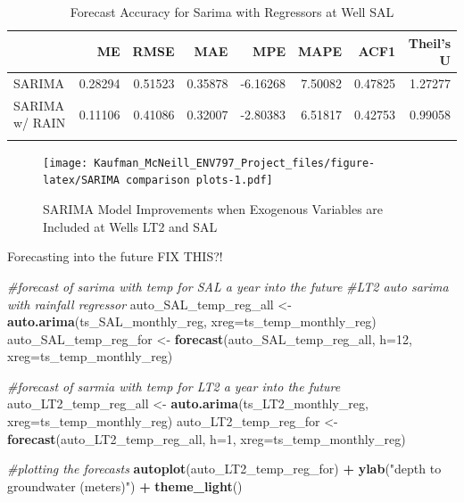\documentclass[
]{article}
\newenvironment{Shaded}{\begin{snugshade}}{\end{snugshade}}
\newcommand{\AttributeTok}[1]{\textcolor[rgb]{0.13,0.29,0.53}{#1}}
\newcommand{\CommentTok}[1]{\textcolor[rgb]{0.56,0.35,0.01}{\textit{#1}}}
\newcommand{\DecValTok}[1]{\textcolor[rgb]{0.00,0.00,0.81}{#1}}
\newcommand{\FunctionTok}[1]{\textcolor[rgb]{0.13,0.29,0.53}{\textbf{#1}}}
\newcommand{\NormalTok}[1]{#1}
\newcommand{\OtherTok}[1]{\textcolor[rgb]{0.56,0.35,0.01}{#1}}
\newcommand{\SpecialCharTok}[1]{\textcolor[rgb]{0.81,0.36,0.00}{\textbf{#1}}}
\newcommand{\StringTok}[1]{\textcolor[rgb]{0.31,0.60,0.02}{#1}}
\begin{document}
\begin{table}
\centering\centering
\caption{\label{tab:compare accuracy for all SARIMAs}Forecast Accuracy for Sarima with Regressors at Well SAL}
\centering
\begin{tabular}[t]{l|r|r|r|r|r|r|r}
\hline
  & ME & RMSE & MAE & MPE & MAPE & ACF1 & Theil's U\\
\hline
SARIMA & 0.28294 & 0.51523 & 0.35878 & -6.16268 & 7.50082 & 0.47825 & 1.27277\\
\hline
SARIMA w/ RAIN & 0.11106 & 0.41086 & 0.32007 & -2.80383 & 6.51817 & 0.42753 & 0.99058\\
\hline
\cellcolor{gray!10}{SARIMA w/ TEMP} & \cellcolor{gray!10}{-0.03167} & \cellcolor{gray!10}{0.35584} & \cellcolor{gray!10}{0.28774} & \cellcolor{gray!10}{0.03923} & \cellcolor{gray!10}{5.75457} & \cellcolor{gray!10}{0.32779} & \cellcolor{gray!10}{0.84574}\\
\hline
\end{tabular}
\end{table}

\begin{figure}
\centering
\texttt{[image: Kaufman\_McNeill\_ENV797\_Project\_files/figure-latex/SARIMA comparison plots-1.pdf]}
\caption{SARIMA Model Improvements when Exogenous Variables are Included
at Wells LT2 and SAL}
\end{figure}

Forecasting into the future FIX THIS?!

\begin{Shaded}
\begin{Highlighting}[]
\CommentTok{\#forecast of sarima with temp for SAL a year into the future}
\CommentTok{\#LT2 auto sarima with rainfall regressor}
\NormalTok{auto\_SAL\_temp\_reg\_all }\OtherTok{\textless{}{-}} \FunctionTok{auto.arima}\NormalTok{(ts\_SAL\_monthly\_reg, }
                                    \AttributeTok{xreg=}\NormalTok{ts\_temp\_monthly\_reg)}
\NormalTok{auto\_SAL\_temp\_reg\_for }\OtherTok{\textless{}{-}} \FunctionTok{forecast}\NormalTok{(auto\_SAL\_temp\_reg\_all, }
                                  \AttributeTok{h=}\DecValTok{12}\NormalTok{,  }
                                  \AttributeTok{xreg=}\NormalTok{ts\_temp\_monthly\_reg)}

\CommentTok{\#forecast of sarmia with temp for LT2 a year into the future}
\NormalTok{auto\_LT2\_temp\_reg\_all }\OtherTok{\textless{}{-}} \FunctionTok{auto.arima}\NormalTok{(ts\_LT2\_monthly\_reg, }
                                    \AttributeTok{xreg=}\NormalTok{ts\_temp\_monthly\_reg)}
\NormalTok{auto\_LT2\_temp\_reg\_for }\OtherTok{\textless{}{-}} \FunctionTok{forecast}\NormalTok{(auto\_LT2\_temp\_reg\_all,}
                                  \AttributeTok{h=}\DecValTok{1}\NormalTok{,}
                                  \AttributeTok{xreg=}\NormalTok{ts\_temp\_monthly\_reg)}

\CommentTok{\#plotting the forecasts}
\FunctionTok{autoplot}\NormalTok{(auto\_LT2\_temp\_reg\_for) }\SpecialCharTok{+} 
  \FunctionTok{ylab}\NormalTok{(}\StringTok{"depth to groundwater (meters)"}\NormalTok{) }\SpecialCharTok{+} 
  \FunctionTok{theme\_light}\NormalTok{()}
\end{Highlighting}
\end{Shaded}
\end{document}
